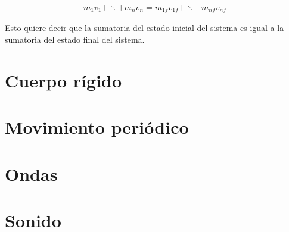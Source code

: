 \documentclass[12pt]{article}
\begin{document}
\begin{align*}
	m_{1}v_{1} + \ddots + m_{n}v_{n} = m_{1f}v_{1f} + \ddots + m_{nf}v_{nf}
\end{align*}

Esto quiere decir que la sumatoria del estado inicial del sistema es igual a la 
sumatoria del estado final del sistema.

\pagebreak

\section{Cuerpo rígido}

\pagebreak

\section{Movimiento periódico}

\pagebreak

\section{Ondas}

\pagebreak

\section{Sonido}
\end{document}
